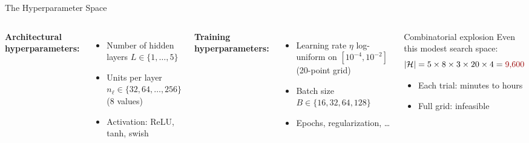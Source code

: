 \documentclass[aspectratio=169,11pt]{beamer}
\newcommand{\emphc}[1]{\textcolor{harvardcrimson}{#1}}
\begin{document}
\begin{frame}{The Hyperparameter Space}
\begin{columns}[T]
\textbf{Architectural hyperparameters:}
\begin{itemize}
    \item Number of hidden layers $L \in \{1, \ldots, 5\}$
    \item Units per layer $n_\ell \in \{32, 64, \ldots, 256\}$ (8 values)
    \item Activation: ReLU, tanh, swish
\end{itemize}

\vspace{0.3cm}
\textbf{Training hyperparameters:}
\begin{itemize}
    \item Learning rate $\eta$ log-uniform on $[10^{-4}, 10^{-2}]$ (20-point grid)
    \item Batch size $B \in \{16, 32, 64, 128\}$
    \item Epochs, regularization, \ldots
\end{itemize}

\begin{block}{Combinatorial explosion}
Even this modest search space:
\[
    |\mathcal{H}| = 5 \times 8 \times 3 \times 20 \times 4 = \emphc{9{,}600}
\]
\vspace{-0.2cm}
\begin{itemize}
    \item Each trial: minutes to hours
    \item Full grid: \emphc{infeasible}
\end{itemize}
\end{block}
\end{columns}
\end{frame}
\end{document}
